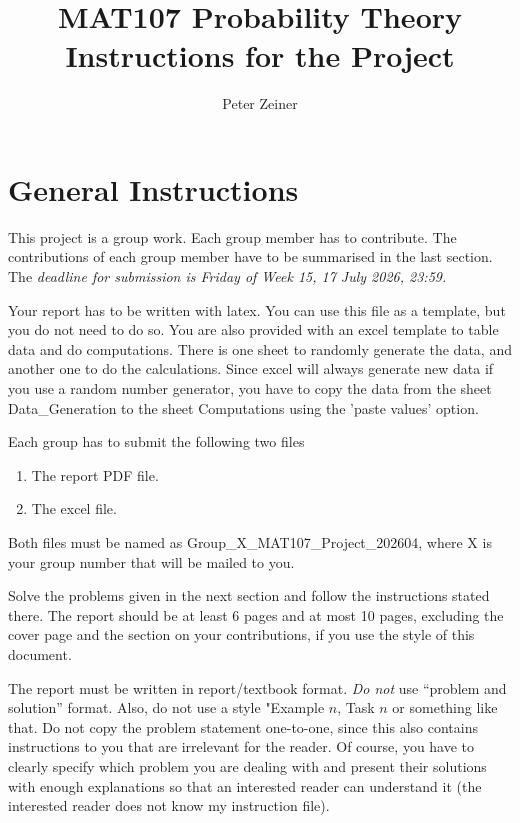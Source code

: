 \documentclass[12pt]{article}
\title{MAT107 Probability Theory \\ Instructions for the Project}
\author{Peter Zeiner}
\theoremstyle{definition}
\begin{document}
\maketitle
\thispagestyle{fancy}	 

\newpage

\setlength{\headheight}{0cm}
 
\section{General Instructions}
 
 	This project is a group work. Each group member has to contribute. The contributions of each group member have to be summarised in the last section. The \emph{deadline for submission is Friday of Week 15, 17 July 2026, 23:59.}
 	
 	Your report has to be written with latex. You can use this file as a template, but you do not need to do so. You are also provided with an excel template to table data and do computations. There is one sheet to randomly generate the data, and another one to do the calculations. Since excel will always generate new data if you use a random number generator, you have to copy the data from the sheet Data\_Generation to the sheet Computations using the 'paste values' option. 
 	
 	
	Each group has to submit the following two files
 	\begin{enumerate}
 		\item The report PDF file.
 		\item The excel file.
 	\end{enumerate}
 	Both files must be named as Group\_X\_MAT107\_Project\_202604, where X is your group number that will be mailed to you.
 
 	Solve the problems given in the next section and follow the instructions stated there. 
 	The report should be at least 6 pages and at most 10 pages, excluding the cover page and the section on your contributions, if you use the style of this document. 
 	
 	The report must be written in report/textbook format. \emph{Do not} use ``problem and solution'' format. Also, do not use a style "Example $n$, Task $n$ or something like that. Do not copy the problem statement one-to-one, since this also contains instructions to you that are irrelevant for the reader. Of course, you have to clearly specify which problem you are dealing with and present their solutions with enough explanations so that an interested reader can understand it (the interested reader does not know my instruction file).
 	
\end{document}
